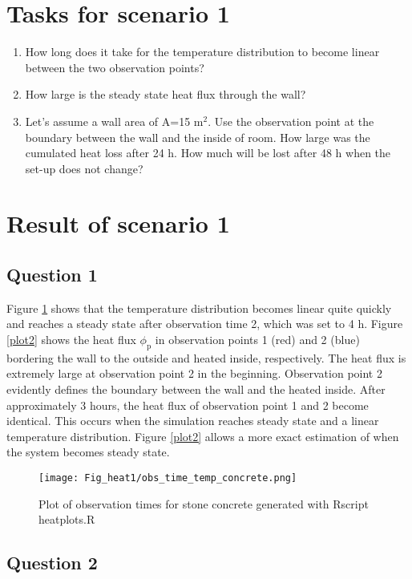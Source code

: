 \section*{Tasks for scenario 1}

\begin{enumerate}
\item How long does it take for the temperature distribution to become linear between the two observation points?
\item How large is the steady state heat flux through the wall?
\item Let's assume a wall area of A=15 m$^2$. Use the observation point at the boundary between the wall and the inside of room. How large was the cumulated heat loss after 24 h. How much will be lost after 48 h when the set-up does not change?
\end{enumerate}


\section*{Result of scenario 1}

\subsection*{Question 1}
Figure \ref{plot1} shows that the temperature distribution becomes linear quite quickly and reaches a steady state after observation time 2, which was set to 4 h. Figure \ref{plot2} shows the heat flux $\phi_{\mathrm{p}}$ in observation points 1 (red) and 2 (blue) bordering the wall to the outside and heated inside, respectively.  The heat flux is extremely large at observation point 2 in the beginning. Observation point 2 evidently defines the boundary between the wall and the heated inside. After approximately 3 hours, the heat flux of observation point 1 and 2 become identical. This occurs when the simulation reaches steady state and a linear temperature distribution. Figure \ref{plot2} allows a more exact estimation of when the system becomes steady state. 

\begin{figure}[!h]
\centering
\texttt{[image: Fig\_heat1/obs\_time\_temp\_concrete.png]}
\caption{\label{plot1}Plot of observation times for stone concrete generated with Rscript heatplots.R}
\end{figure}

\subsection*{Question 2}

